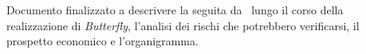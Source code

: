 Documento finalizzato a descrivere la  seguita da \gruppo\ lungo il corso della realizzazione di \textit{Butterfly},
l'analisi dei rischi che potrebbero verificarsi, il prospetto economico e l'organigramma.